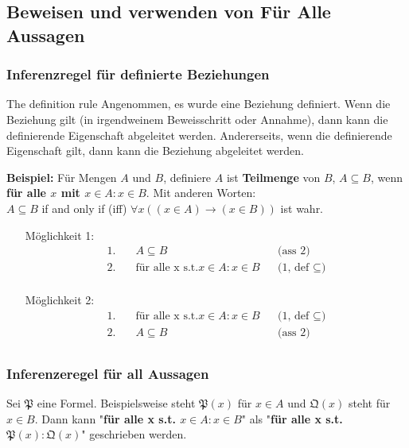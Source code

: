     \subsection{Beweisen und verwenden von Für Alle Aussagen}
        \subsubsection{Inferenzregel für definierte Beziehungen}

            {
                The definition rule 
            }
            {
                Angenommen, es wurde eine Beziehung definiert. Wenn die Beziehung gilt (in irgendweinem Beweisschritt oder Annahme), dann kann die definierende Eigenschaft abgeleitet werden. Andererseits, wenn die definierende Eigenschaft gilt, dann kann die Beziehung abgeleitet werden.
            }

            \textbf{Beispiel: } Für Mengen $A$ und $B$, definiere $A$ ist \textbf{Teilmenge} von $B$, $A \subseteq B$, wenn \textbf{für alle $x$ mit $x \in A : x \in B$}. Mit anderen Worten: \\ $A \subseteq B$ if and only if (iff) $\forall x ((x \in A) \rightarrow (x \in B))$ ist wahr.
            \begin{itemize}
                \item [Möglichkeit 1:]
                    \begin{align*}
                        1. &\quad A \subseteq B                   && \text{(ass 2)} \\
                        2. &\quad \text{für alle x s.t.} x \in A : x \in B                      && \text{(1, def $\subseteq$)} \\
                    \end{align*}
                \item [Möglichkeit 2:]
                    \begin{align*}
                        1. &\quad \text{für alle x s.t.} x \in A : x \in B                      && \text{(1, def $\subseteq$)} \\
                        2. &\quad A \subseteq B                   && \text{(ass 2)} \\
                    \end{align*}
            \end{itemize}

        \subsubsection{Inferenzeregel für all Aussagen}
            Sei $\mathfrak{P} $ eine Formel. Beispielsweise steht $\mathfrak{P}(x)$ für $x \in A$ und $\mathfrak{Q}(x)$ steht für $x \in B$. Dann kann "\textbf{für alle x s.t. $x \in A: x \in B$}" als "\textbf{für alle x s.t. $\mathfrak{P}(x) : \mathfrak{Q}(x)$}" geschrieben werden.
